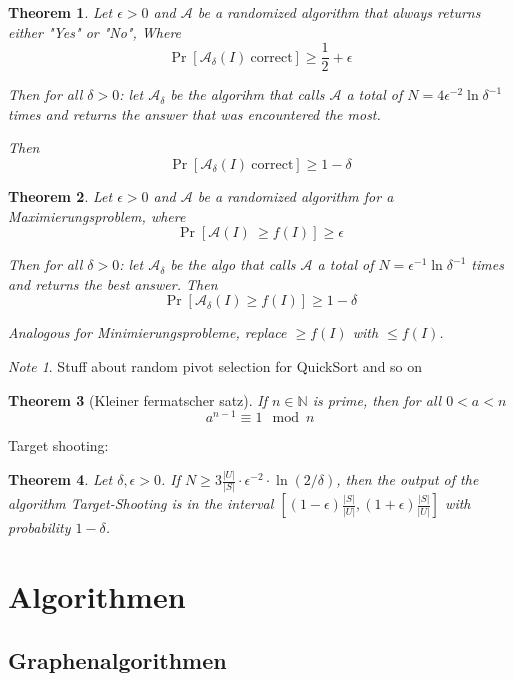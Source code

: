 \documentclass[12pt]{extarticle}
\theoremstyle{definition}
\theoremstyle{remark}
\newtheorem{note}{Note}
\theoremstyle{plain}
\newtheorem{theorem}{Theorem}
\theoremstyle{plain}
\theoremstyle{plain}
\begin{document}
\begin{theorem}
    Let $\epsilon > 0$ and $\mathcal{A}$ be a randomized algorithm that always returns either "Yes" or "No",
    Where
    \[ \Pr[\mathcal{A}_\delta(I)\ \mbox{correct}] \ge \frac{1}{2} + \epsilon \]

    Then for all $\delta > 0$:
    let $\mathcal{A}_\delta$ be the algorihm that calls $\mathcal{A}$ a total of $N = 4 \epsilon^{-2} \ln \delta^{-1}$ times
    and returns the answer that was encountered the most.

    Then
    \[ \Pr[\mathcal{A}_\delta(I) \ \mbox{correct}] \ge 1 - \delta \]
\end{theorem}

\begin{theorem}
    Let $\epsilon > 0$ and $\mathcal{A}$ be a randomized algorithm for a \textit{Maximierungsproblem}, where
    \[ \Pr[\mathcal{A}(I)\ \ge f(I)] \ge \epsilon  \]

    Then for all $\delta > 0$:
    let $\mathcal{A}_\delta$ be the algo that calls $\mathcal{A}$ a total of $N = \epsilon^{-1} \ln \delta^{-1}$ times
    and returns the best answer. Then
    \[ \Pr[\mathcal{A}_\delta(I) \ge f(I)] \ge 1 - \delta \]

    Analogous for \textit{Minimierungsprobleme}, replace $\ge f(I)$ with $\le f(I)$.
\end{theorem}

\begin{note}
    Stuff about random pivot selection for QuickSort and so on
\end{note}

\begin{theorem}[Kleiner fermatscher satz]
    If $n \in \mathbb{N}$ is prime, then for all $0 < a < n$
    \[ a^{n - 1} \equiv 1 \mod n \]
\end{theorem}


Target shooting:

\begin{theorem}
    Let $\delta,\epsilon > 0$. If $N \ge 3 \frac{|U|}{|S|} \cdot \epsilon^{-2} \cdot \ln(2 / \delta)$, then
    the output of the algorithm Target-Shooting is in the interval $\left[ (1-\epsilon)\frac{|S|}{|U|},(1+\epsilon)\frac{|S|}{|U|} \right]$
    with probability $1 - \delta$.
\end{theorem}

\section{Algorithmen}

\subsection{Graphenalgorithmen}
\end{document}
